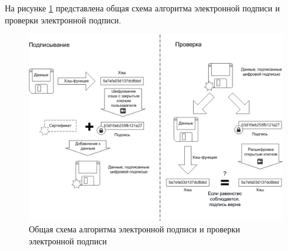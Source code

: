 На рисунке \ref{img:sign} представлена общая схема алгоритма электронной подписи и проверки электронной подписи.

\begin{figure}[!htb]\centering
	\includegraphics[width=0.75\linewidth]{../img/common.png}
	\caption{Общая схема алгоритма электронной подписи и проверки электронной подписи}
	\label{img:sign}
\end{figure}
